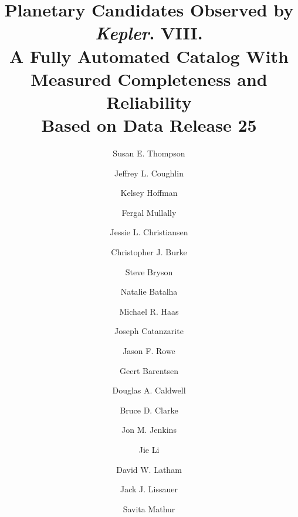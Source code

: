 \documentclass[twocolumn,tighten]{aastex61}
\renewcommand{\_}{\discretionary{\underscore}{}{\underscore}}  %
\newcommand\Kepler{\textit{Kepler}}
\begin{document}

\title{Planetary Candidates Observed by \Kepler. VIII.\\
A Fully Automated Catalog With Measured Completeness and Reliability\\Based on Data Release 25 }

%
\author[0000-0003-1846-5300]{Susan E. Thompson}
\affiliation{\seti}
\affiliation{\nasa}
\affiliation{\stsci}

\author[0000-0003-1634-9672]{Jeffrey L. Coughlin}
\affiliation{\nasa}
\affiliation{\seti}

\author{Kelsey Hoffman}
\affiliation{\seti}

\author{Fergal Mullally}
\affiliation{\seti}
\affiliation{\nasa}
\affiliation{\orbital}

\author{Jessie L. Christiansen}
\affiliation{\nexsci}

\author{Christopher J. Burke}
\affiliation{\nasa}
\affiliation{\seti}
\affiliation{\mitadd}

\author{Steve Bryson}
\affiliation{\nasa}

\author{Natalie Batalha}
\affiliation{\nasa}

\author{Michael R. Haas}
\affiliation{\nasa}


\author{Joseph Catanzarite}
\affiliation{\seti}
\affiliation{\nasa}

\author[0000-0002-5904-1865]{Jason F. Rowe}
\affiliation{\bishop}

\author{Geert Barentsen}
\affiliation{\bari}


\author{Douglas A. Caldwell}
\affiliation{\seti}
\affiliation{\nasa}


\author{Bruce D. Clarke}
\affiliation{\seti}
\affiliation{\nasa}

\author[0000-0002-4715-9460]{Jon M. Jenkins}
\affiliation{\nasa}

\author{Jie Li}
\affiliation{\seti}

\author[0000-0001-9911-7388]{David W. Latham}
\affiliation{\cfa}

\author{Jack J. Lissauer}
\affiliation{\nasa}

\author{Savita Mathur}
\end{document}

